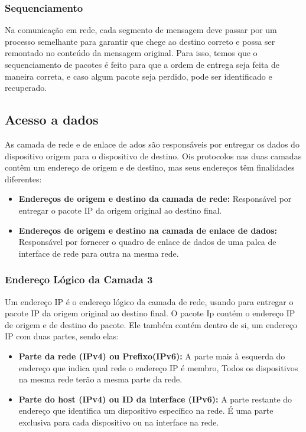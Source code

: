 \documentclass[12pt a4paper]{paper}
\begin{document}
\subsubsection{Sequenciamento} %
\label{sec:Sequenciamento}
Na comunicação em rede, cada segmento de mensagem deve passar por um processo 
semelhante para garantir que chege ao destino correto e possa ser remontado no 
conteúdo da mensagem original. Para isso, temos que o sequenciamento de pacotes
é feito para que a ordem de entrega seja feita de maneira correta, e caso algum 
pacote seja perdido, pode ser identificado e recuperado.


\subsection{Acesso a dados} %
\label{sub: Acesso a dados}
As camada de rede e de enlace de ados são responsáveis por entregar os dados do 
dispositivo origem para o dispositivo de destino. Ois protocolos nas duas camadas 
contêm um endereço de origem e de destino, mas seus endereços têm finalidades 
diferentes:

\begin{itemize}
  \item \textbf{Endereços de origem e destino da camada de rede: } Responsável por entregar o pacote IP da origem original ao destino final.
  \item \textbf{Endereços de origem e destino na camada de enlace de dados: } Responsável por fornecer o quadro de enlace de dados de uma palca de interface de rede para outra na mesma rede.
\end{itemize}

\subsubsection{Endereço Lógico da Camada 3} %
\label{sec:Endereço Lógico da Camada 3}
Um endereço IP é o endereço lógico da camada de rede, usando para entregar o pacote IP 
da origem original ao destino final. O pacote Ip contém o endereço IP de origem e de 
destino do pacote. Ele também contém dentro de si, um endereço IP com duas partes, sendo elas: 

\begin{itemize}
  \item \textbf{Parte da rede (IPv4) ou Prefixo(IPv6): }A parte mais à esquerda do endereço que indica qual rede o endereço IP é membro, Todos os dispositivos na mesma rede terão a mesma parte da rede.
  \item \textbf{Parte do host (IPv4) ou ID da interface (IPv6): } A parte restante do endereço que identifica um dispositivo específico na rede. É uma parte exclusiva para cada dispositivo ou na interface na rede.
\end{itemize}
\end{document}

